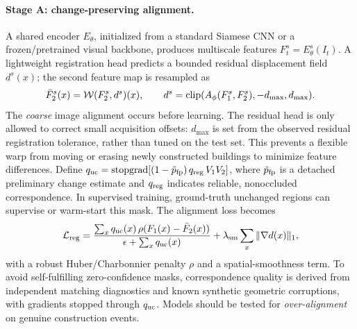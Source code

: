\paragraph{Stage A: change-preserving alignment.} A shared encoder $E_{\theta}$, initialized from a standard Siamese CNN or a frozen/pretrained visual backbone, produces multiscale features $F_t^s=E_{\theta}^s(I_t)$. A lightweight registration head predicts a bounded residual displacement field $d^s(x)$; the second feature map is resampled as
\begin{equation}
 \bar F_2^s(x)={\cal W}(F_2^s,d^s)(x),\qquad
 d^s=\operatorname{clip}(A_{\phi}(F_1^s,F_2^s),-d_{\max},d_{\max}).
 \label{eq:align}
\end{equation}
The \emph{coarse} image alignment occurs before learning. The residual head is only allowed to correct small acquisition offsets: $d_{\max}$ is set from the observed residual registration tolerance, rather than tuned on the test set. This prevents a flexible warp from moving or erasing newly constructed buildings to minimize feature differences. Define $q_{\rm uc}=\operatorname{stopgrad}[(1-\tilde p_{\rm fp})\,q_{\rm reg}\,V_1V_2]$, where $\tilde p_{\rm fp}$ is a detached preliminary change estimate and $q_{\rm reg}$ indicates reliable, nonoccluded correspondence. In supervised training, ground-truth unchanged regions can supervise or warm-start this mask. The alignment loss becomes
\begin{equation}
 {\cal L}_{\rm reg}=\frac{\sum_x q_{\rm uc}(x)\,\rho(F_1(x)-\bar F_2(x))}{\epsilon+\sum_x q_{\rm uc}(x)}
 +\lambda_{\rm sm}\sum_x\|\nabla d(x)\|_1,
 \label{eq:regloss}
\end{equation}
with a robust Huber/Charbonnier penalty $\rho$ and a spatial-smoothness term. To avoid self-fulfilling zero-confidence masks, correspondence quality is derived from independent matching diagnostics and known synthetic geometric corruptions, with gradients stopped through $q_{\rm uc}$. Models should be tested for \emph{over-alignment} on genuine construction events.

